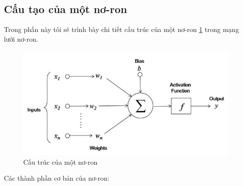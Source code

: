 \subsection{Cấu tạo của một nơ-ron}
\label{sec:neuralStruct}
\hspace{5mm} Trong phần này tôi sẽ trình bày chi tiết cấu trúc của một nơ-ron \ref{fig:aNeural} trong mạng lưới nơ-ron.
\begin{center}
    \begin{figure}[h]
    \begin{center}
     \includegraphics[scale=0.5]{chap3/image/cauTrucMotNoron.jpg}
    \end{center}
    \caption{Cấu trúc của một nơ-ron}
 	\label{fig:aNeural}
    \end{figure}
\end{center}
\par
 Các thành phần cơ bản của nơ-ron:

